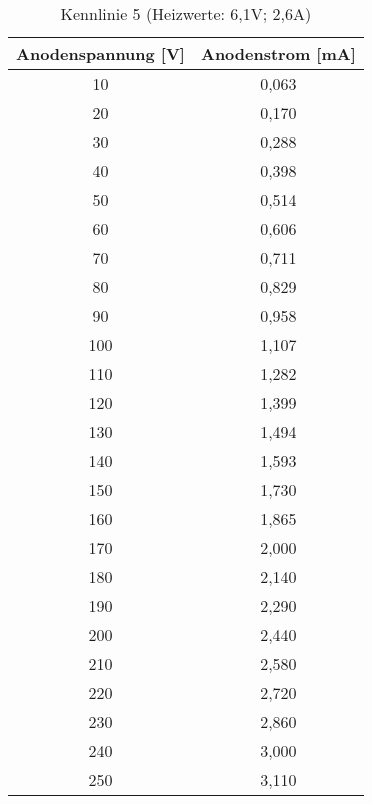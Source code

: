 \begin{table}[h]
	\begin{center}
		\begin{tabular}{cc}
			Anodenspannung [V] & Anodenstrom [mA]\\ \hline
			10	&0,063\\
			20	&0,170\\
			30	&0,288\\
			40	&0,398\\
			50	&0,514\\
			60	&0,606\\
			70	&0,711\\
			80	&0,829\\
			90	&0,958\\
			100	&1,107\\
			110	&1,282\\
			120	&1,399\\
			130	&1,494\\
			140	&1,593\\
			150	&1,730\\
			160	&1,865\\
			170	&2,000\\
			180	&2,140\\
			190	&2,290\\
			200	&2,440\\
			210	&2,580\\
			220	&2,720\\
			230	&2,860\\
			240	&3,000\\
			250	&3,110
		\end{tabular}
		\caption{Kennlinie 5 (Heizwerte: 6,1V; 2,6A)}
		\label{taba5}
	\end{center}
\end{table}